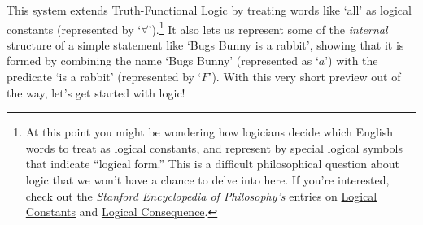 \noindent This system extends Truth-Functional Logic by treating words like `all' as logical constants (represented by `$\forall$').\footnote{At this point you might be wondering how logicians decide which English words to treat as logical constants, and represent by special logical symbols that indicate ``logical form.''  This is a difficult philosophical question about logic that we won't have a chance to delve into here.  If you're interested, check out the \emph{Stanford Encyclopedia of Philosophy's} entries on \href{http://plato.stanford.edu/entries/logical-constants/}{Logical Constants} and  \href{http://plato.stanford.edu/entries/logical-consequence/}{Logical Consequence}.}  It also lets us represent some of the \emph{internal} structure of a simple statement like `Bugs Bunny is a rabbit', showing that it is formed by combining the name `Bugs Bunny' (represented as `$a$') with the predicate `is a rabbit' (represented by `$F$'). With this very short preview out of the way, let's get started with logic! 




%
%
